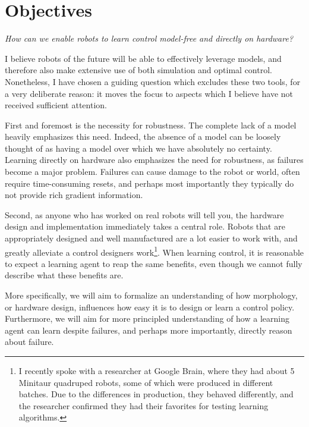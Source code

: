 \section{Objectives}
\emph{How can we enable robots to learn control model-free and directly on hardware?} \par
I believe robots of the future will be able to effectively leverage models, and therefore also make extensive use of both simulation and optimal control.
Nonetheless, I have chosen a guiding question which excludes these two tools, for a very deliberate reason: it moves the focus to aspects which I believe have not received sufficient attention. \par
First and foremost is the necessity for robustness. The complete lack of a model heavily emphasizes this need. Indeed, the absence of a model can be loosely thought of as having a model over which we have absolutely no certainty.
Learning directly on hardware also emphasizes the need for robustness, as failures become a major problem. Failures can cause damage to the robot or world, often require time-consuming resets, and perhaps most importantly they typically do not provide rich gradient information. \par
Second, as anyone who has worked on real robots will tell you, the hardware design and implementation immediately takes a central role. Robots that are appropriately designed and well manufactured are a lot easier to work with, and greatly alleviate a control designers work\footnote{I recently spoke with a researcher at Google Brain, where they had about 5 Minitaur quadruped robots, some of which were produced in different batches. Due to the differences in production, they behaved differently, and the researcher confirmed they had their favorites for testing learning algorithms.}. When learning control, it is reasonable to expect a learning agent to reap the same benefits, even though we cannot fully describe what these benefits are. \par

More specifically, we will aim to formalize an understanding of how morphology, or hardware design, influences how easy it is to design or learn a control policy. Furthermore, we will aim for more principled understanding of how a learning agent can learn despite failures, and perhaps more importantly, directly reason about failure.


